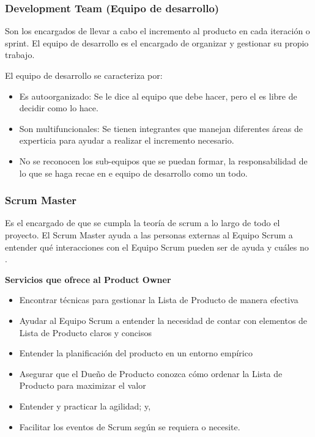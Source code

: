 \subsubsection{Development Team (Equipo de desarrollo)}

Son los encargados de llevar a cabo el incremento al producto en cada iteración o sprint. El equipo de desarrollo es el encargado de organizar y gestionar su propio trabajo.

El equipo de desarrollo se caracteriza por:
	
\begin{itemize}
		  \item Es autoorganizado: Se le dice al equipo que debe hacer, pero el es libre de decidir como lo hace.
		  \item Son multifuncionales: Se tienen integrantes que manejan diferentes áreas de experticia para ayudar a realizar el incremento necesario.
		  \item No se reconocen los sub-equipos que se puedan formar, la responsabilidad de lo que se haga recae en e equipo de desarrollo como un todo.
		\end{itemize}

\subsubsection{Scrum Master}

Es el encargado de que se cumpla la teoría de scrum a lo largo de todo el proyecto. El Scrum Master ayuda a las personas externas al Equipo Scrum a entender qué interacciones con el Equipo Scrum pueden ser de ayuda y cuáles no \cite{scrum_guide}.

\textbf{Servicios que ofrece al Product Owner}
	
\begin{itemize}
		  \item Encontrar técnicas para gestionar la Lista de Producto de manera efectiva
		  \item Ayudar al Equipo Scrum a entender la necesidad de contar con elementos de Lista de Producto claros y concisos
		  \item Entender la planificación del producto en un entorno empírico
		  \item Asegurar que el Dueño de Producto conozca cómo ordenar la Lista de Producto para maximizar el valor
		  \item Entender y practicar la agilidad; y,
		  \item Facilitar los eventos de Scrum según se requiera o necesite.
\end{itemize}
		\cite{scrum_guide}

